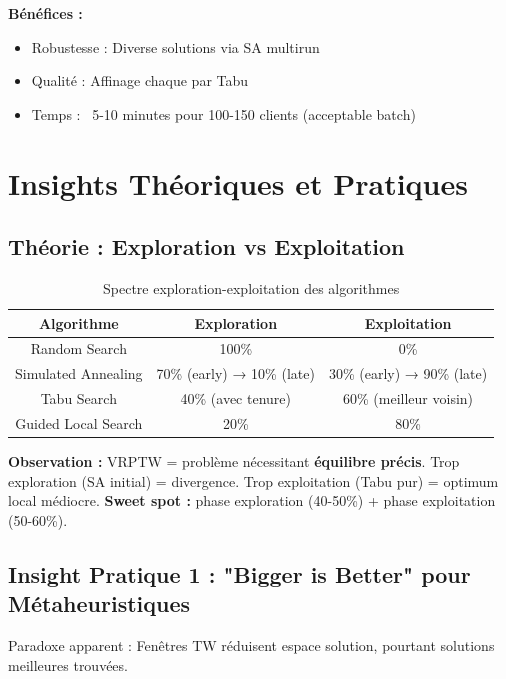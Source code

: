 \documentclass[12pt,a4paper,twoside]{report}
\begin{document}
\textbf{Bénéfices :}
\begin{itemize}
    \item Robustesse : Diverse solutions via SA multirun
    \item Qualité : Affinage chaque par Tabu
    \item Temps : ~5-10 minutes pour 100-150 clients (acceptable batch)
\end{itemize}

\section{Insights Théoriques et Pratiques}

\subsection{Théorie : Exploration vs Exploitation}

\begin{table}[H]
    \centering
    \caption{Spectre exploration-exploitation des algorithmes}
    \begin{tabular}{|c|c|c|}
        \hline
        \textbf{Algorithme} & \textbf{Exploration}       & \textbf{Exploitation}      \\
        \hline
        Random Search       & 100\%                      & 0\%                        \\
        Simulated Annealing & 70\% (early) → 10\% (late) & 30\% (early) → 90\% (late) \\
        Tabu Search         & 40\% (avec tenure)         & 60\% (meilleur voisin)     \\
        Guided Local Search & 20\%                       & 80\%                       \\
        \hline
    \end{tabular}
\end{table}

\textbf{Observation :} VRPTW = problème nécessitant \textbf{équilibre précis}. Trop exploration (SA initial) = divergence. Trop exploitation (Tabu pur) = optimum local médiocre. \textbf{Sweet spot :} phase exploration (40-50\%) + phase exploitation (50-60\%).

\subsection{Insight Pratique 1 : "Bigger is Better" pour Métaheuristiques}

Paradoxe apparent : Fenêtres TW réduisent espace solution, pourtant solutions
meilleures trouvées.
\end{document}
